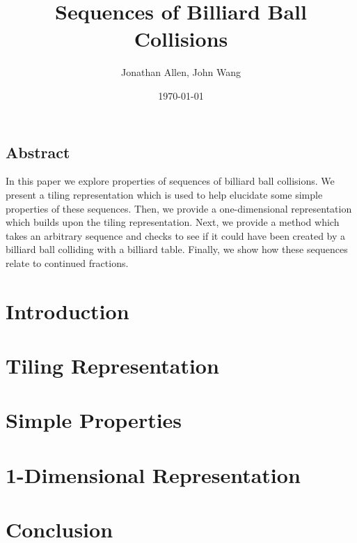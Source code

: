 \documentclass[12pt]{amsart}   %
\begin{document}
\graphicspath{ {figures/} }

\title[Billiards]{Sequences of Billiard Ball Collisions}

\author{Jonathan Allen, John Wang}
\date{\today}

\maketitle

\subsection*{Abstract}

In this paper we explore properties of sequences of billiard ball collisions. We present a tiling representation which is used to help elucidate some simple properties of these sequences. Then, we provide a one-dimensional representation which builds upon the tiling representation. Next, we provide a method which takes an arbitrary sequence and checks to see if it could have been created by a billiard ball colliding with a billiard table. Finally, we show how these sequences relate to continued fractions.

\section{Introduction}


\section{Tiling Representation}


\section{Simple Properties}


\section{1-Dimensional Representation}


\section{Conclusion}


\begin{appendix}
\end{appendix}
\end{document}
